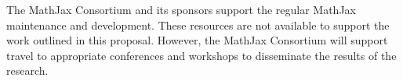 \documentclass[12pt]{amsart}
\begin{document}
The MathJax Consortium and its sponsors support the regular MathJax maintenance 
and development. These resources are not available to support the work outlined 
in this proposal. However, the MathJax Consortium will support travel to 
appropriate conferences and workshops to disseminate the results of the 
research.

% 
% 
% 
% 
\end{document}
